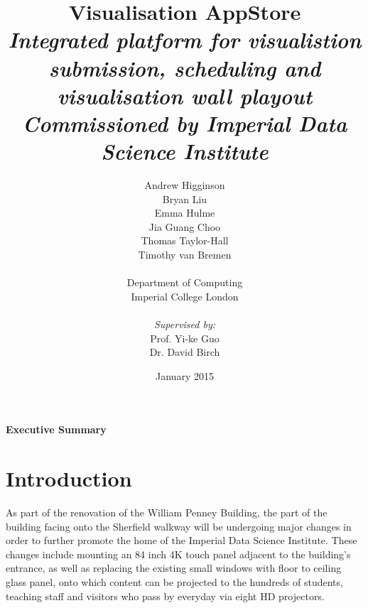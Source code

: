 \documentclass[a4paper, titlepage]{article}
\title{Visualisation AppStore \\ \vspace{10pt}
\textit{\large Integrated platform for visualistion submission, scheduling and visualisation wall playout} \\ \vspace*{-5pt}
\textit{\large Commissioned by Imperial Data Science Institute}}
\author{Andrew Higginson\\ Bryan Liu \\ Emma Hulme \\ Jia Guang Choo \\
        Thomas Taylor-Hall \\ Timothy van Bremen \\\\ 
        Department of Computing \\ Imperial College London \\\\ \textit{Supervised by:} \\
        Prof. Yi-ke Guo \\ Dr. David Birch}
\date{January 2015}
\begin{document}
\maketitle


\newpage
{}
\Large
\textbf{Executive Summary}

\normalsize





\newpage
\tableofcontents
\listoffigures
\listoftables


\newpage
{}
\section{Introduction}
As part of the renovation of the William Penney Building, the part of the building facing onto the Sherfield walkway will be undergoing major changes in order to further promote the home of the Imperial Data Science Institute. These changes include mounting an 84 inch 4K touch panel adjacent to the building's entrance, as well as replacing the existing small windows with floor to ceiling glass panel, onto which content can be projected to the hundreds of students, teaching staff and visitors who pass by everyday via eight HD projectors.
\end{document}
